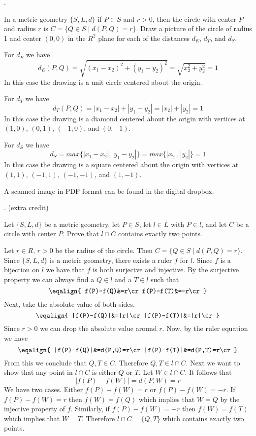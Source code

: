 \vfill
\eject

.

In a metric geometry $\{S,L,d\}$ if $P\in S$ and $r>0$, then the circle
with center $P$ and radius $r$ is $C=\{Q\in S\mid d(P,Q)=r\}$.
Draw a picture of the circle of radius 1 and center $(0,0)$ in the
$R^2$ plane for each of the distances $d_E$, $d_T$, and $d_S$.

\medskip
For $d_E$ we have
$$d_E(P,Q)=\sqrt{(x_1-x_2)^2+(y_1-y_2)^2}=\sqrt{x_2^2+y_2^2}=1$$
In this case the drawing is a unit circle centered about the origin.

\medskip
For $d_T$ we have 
$$d_T(P,Q)=|x_1-x_2|+|y_1-y_2|=|x_2|+|y_2|=1$$
In this case the drawing is a diamond centered about
the origin with vertices at $(1,0)$, $(0,1)$,
$(-1,0)$, and $(0,-1)$.

\medskip
For $d_S$ we have
$$d_S=max\{|x_1-x_2|,|y_1-y_2|\}=max\{|x_2|,|y_2|\}=1$$
In this case the drawing is a square centered about the origin
with vertices at $(1,1)$, $(-1,1)$, $(-1,-1)$, and $(1,-1)$.

\medskip
A scanned image in PDF format can be found in the digital dropbox.

. (extra credit)

Let $\{S,L,d\}$ be a metric geometry, let $P\in S$, let $l\in L$ with $P\in l$,
and let $C$ be a circle with center $P$.
Prove that $l\cap C$ contains exactly two points.

\medskip
Let $r\in R$, $r>0$ be the radius of the circle.
Then $C=\{Q\in S\mid d(P,Q)=r\}$.
Since $\{S,L,d\}$ is a metric geometry, there exists a ruler $f$ for $l$.
Since $f$ is a bijection on $l$ we have that $f$ is both surjectve
and injective.
By the surjective property we can always find
a $Q\in l$
and a $T\in l$ such that
$$\eqalign{
f(P)-f(Q)&=r\cr
f(P)-f(T)&=-r\cr
}$$
Next, take the absolute value of both sides.
$$\eqalign{
|f(P)-f(Q)|&=|r|\cr
|f(P)-f(T)|&=|r|\cr
}$$
Since $r>0$ we can drop the absolute value around $r$.
Now, by the ruler equation we have
$$\eqalign{
|f(P)-f(Q)|&=d(P,Q)=r\cr
|f(P)-f(T)|&=d(P,T)=r\cr
}$$
From this we conclude that $Q,T\in C$.
Therefore $Q,T\in l\cap C$.
Next we want to show that any point in $l\cap C$ is either $Q$ or $T$.
Let $W\in l\cap C$.
It follows that
$$|f(P)-f(W)|=d(P,W)=r$$
We have two cases. Either $f(P)-f(W)=r$ or $f(P)-f(W)=-r$.
If $f(P)-f(W)=r$ then $f(W)=f(Q)$ which implies that $W=Q$
by the injective property of $f$.
Similarly, if $f(P)-f(W)=-r$ then $f(W)=f(T)$ which implies that $W=T$.
Therefore $l\cap C=\{Q,T\}$ which contains exactly two points.

